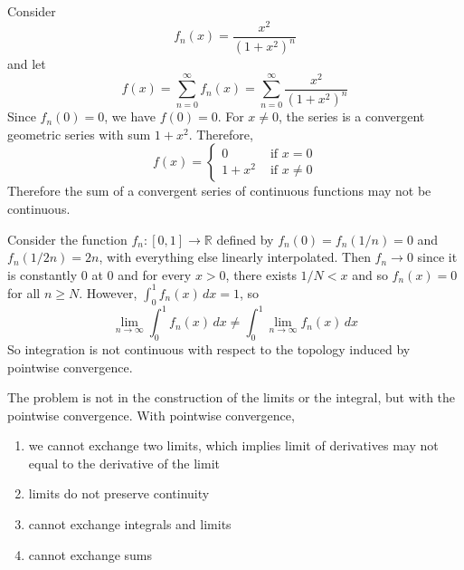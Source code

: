   \begin{example}
    Consider 
    \begin{equation}
      f_n (x) = \frac{x^2}{(1 + x^2)^n}
    \end{equation}
    and let 
    \begin{equation}
      f(x) = \sum_{n=0}^\infty f_n (x) = \sum_{n=0}^\infty \frac{x^2}{(1 + x^2)^n}
    \end{equation}
    Since $f_n (0) = 0$, we have $f(0) = 0$. For $x \neq 0$, the series is a convergent geometric series with sum $1 + x^2$. Therefore, 
    \begin{equation}
      f(x) = \begin{cases} 
        0 & \text{ if } x = 0 \\ 
        1 + x^2 & \text{ if } x \neq 0
      \end{cases}
    \end{equation}
    Therefore the sum of a convergent series of continuous functions may not be continuous. 
  \end{example}

  \begin{example}
    Consider the function $f_n: [0, 1] \to \mathbb{R}$ defined by $f_n (0) = f_n (1/n) = 0$ and $f_n (1/2n) = 2n$, with everything else linearly interpolated. Then $f_n \to 0$ since it is constantly $0$ at $0$ and for every $x > 0$, there exists $1/N < x$ and so $f_n (x) = 0$ for all $n \geq N$. However, $\int_0^1 f_n (x) \,dx = 1$, so 
    \begin{equation}
      \lim_{n \to \infty} \int_0^1 f_n (x)\,dx \neq \int_0^1 \lim_{n \to \infty} f_n (x)\,dx
    \end{equation}
    So integration is not continuous with respect to the topology induced by pointwise convergence. 
  \end{example}

  The problem is not in the construction of the limits or the integral, but with the pointwise convergence. With pointwise convergence, 
  \begin{enumerate}
    \item we cannot exchange two limits, which implies limit of derivatives may not equal to the derivative of the limit
    \item limits do not preserve continuity 
    \item cannot exchange integrals and limits 
    \item cannot exchange sums
  \end{enumerate}

